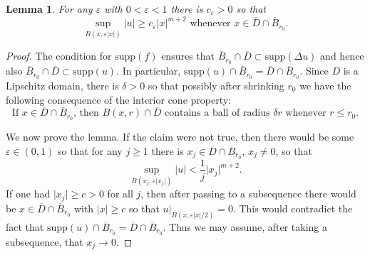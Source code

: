 \documentclass[11pt,a4paper]{amsart}
\newtheorem{Lemma}[Theorem]{Lemma}
\theoremstyle{definition}
\numberwithin{equation}{section}
\newcommand{\abs}[1]{\lvert #1 \rvert}          %
\newcommand{\ol}[1]{\overline{#1}}
\newcommand{\supp}{\mathrm{supp}}
\newcommand{\eps}{\varepsilon}
\begin{document}
\begin{Lemma} \label{lemma_nondegeneracy}
For any $\eps$ with $0 < \eps < 1$ there is $c_{\eps} > 0$ so that 
\[
\sup_{B(x, \eps \abs{x})} \abs{u} \geq c_{\eps} \abs{x}^{m+2} \text{ whenever $x \in \ol{D} \cap \ol{B}_{r_0}$}.
\]
\end{Lemma}
\begin{proof}

The condition for $\supp(f)$ ensures that $\ol{B}_{r_0} \cap \ol{D} \subset \supp(\Delta u)$ and hence also $\ol{B}_{r_0} \cap \ol{D} \subset \supp(u)$. In particular, $\supp(u) \cap \ol{B}_{r_0} = \ol{D} \cap \ol{B}_{r_0}$. Since $D$ is a Lipschitz domain, there is $\delta > 0$ so that possibly after shrinking $r_0$ we have the following consequence of the interior cone property:
\begin{equation} \label{interior_ball}
\text{If $x \in \ol{D} \cap \ol{B}_{r_0}$, then $B(x, r) \cap \ol{D}$ contains a ball of radius $\delta r$ whenever $r \leq r_0$.}
\end{equation}

We now prove the lemma. If the claim were not true, then there would be some $\eps \in (0,1)$ so that for any $j \geq 1$ there is $x_j \in \ol{D} \cap \ol{B}_{r_0}$, $x_j \neq 0$, so that 
\begin{equation} \label{nondegeneracy_contradiction}
\sup_{B(x_j, \eps \abs{x_j})} \abs{u} < \frac{1}{j} \abs{x_j}^{m+2}.
\end{equation}
If one had $\abs{x_j} \geq c > 0$ for all $j$, then after passing to a subsequence there would be $x \in \ol{D} \cap \ol{B}_{r_0}$ with $\abs{x} \geq c$ so that $u|_{B(x, \eps\abs{x}/2)} = 0$. This would contradict the fact that $\supp(u) \cap \ol{B}_{r_0} = \ol{D} \cap \ol{B}_{r_0}$. Thus we may assume, after taking a subsequence, that $x_j \to 0$.


\end{proof}
\end{document}
